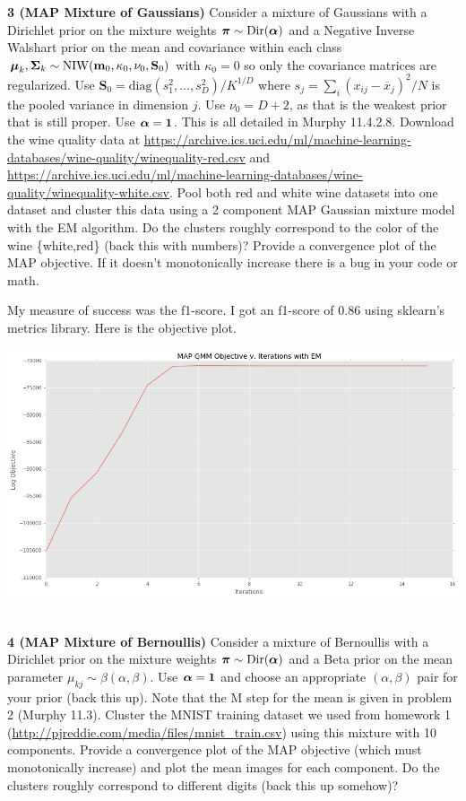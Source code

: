 \documentclass[12pt,letterpaper,fleqn]{hmcpset}
\begin{document}
\textbf{3 (MAP Mixture of Gaussians)} Consider a mixture of Gaussians with a Dirichlet prior on the
mixture weights $\hbox{\boldmath$\pi$} \sim \mathrm{Dir}(\hbox{\boldmath$\alpha$})$ and a Negative Inverse Walshart prior on the
mean and covariance within each class
$\hbox{\boldmath$\mu$}_k,\hbox{\boldmath$\Sigma$}_k \sim \mathrm{NIW}(\mathbf{m}_0,\kappa_0,\nu_0,\mathbf{S}_0)$ with $\kappa_0=0$ so
only the covariance matrices are regularized. Use $\mathbf{S}_0 = \mathrm{diag}(s_1^2,\dots,s_D^2)/K^{1/D}$
where $s_j = \sum_i(x_{ij} - \overline{x}_j)^2/N$ is the pooled variance in dimension $j$. Use $\nu_0 = D + 2$,
as that is the weakest prior that is still proper. Use $\hbox{\boldmath$\alpha$} = {\bf 1}$. This is all detailed in Murphy 11.4.2.8. Download the
wine quality data at \url{https://archive.ics.uci.edu/ml/machine-learning-databases/wine-quality/winequality-red.csv}
and \url{https://archive.ics.uci.edu/ml/machine-learning-databases/wine-quality/winequality-white.csv}. Pool both
red and white wine datasets into one dataset and cluster this data using a 2 component MAP Gaussian mixture model
with the EM algorithm. Do the clusters roughly correspond to the color of the wine \{white,red\} (back this with
numbers)? Provide a convergence plot of the MAP objective. If it doesn't monotonically increase there is a bug
in your code or math.

\vspace{15mm}
My measure of success was the f1-score. I got an f1-score of $0.86$ using sklearn's metrics library. Here is the objective plot.

\includegraphics[scale = .5]{p3_objective.png}\\\\


\newpage

\textbf{4 (MAP Mixture of Bernoullis)} Consider a mixture of Bernoullis with a Dirichlet prior on the mixture
weights $\hbox{\boldmath$\pi$} \sim \mathrm{Dir}(\hbox{\boldmath$\alpha$})$ and a Beta prior on the mean parameter $\mu_{kj} \sim \beta(\alpha,\beta)$.
Use $\hbox{\boldmath$\alpha$}={\bf 1}$ and choose an appropriate $(\alpha,\beta)$ pair for your prior (back this up).
Note that the M step for the mean is given in problem 2 (Murphy 11.3). Cluster the MNIST training dataset we used
from homework 1 (\url{http://pjreddie.com/media/files/mnist_train.csv}) using this mixture with 10 components.
Provide a convergence plot of the MAP objective
(which must monotonically increase) and plot the mean images for each component. Do the clusters roughly correspond to
different digits (back this up somehow)?
\end{document}
